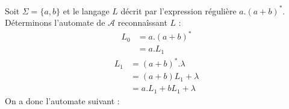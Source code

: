 \begin{example}
    Soit $ \Sigma = \{a,b\}$ et le langage $L$ décrit par l'expression régulière $a.(a+b)^*$. 
    Déterminons l'automate de $ \mathcal{A}$ reconnaîssant $L$ : 
    \begin{align*}
        L_0 &= a.(a + b)^* \\ 
        &= a.L_1 
    \end{align*}  
    \begin{align*}
        L_1 &= (a + b)^* . \lambda \\ 
        &= (a + b) L_1 + \lambda \\ 
        &= a.L_1 + bL_1 + \lambda
    \end{align*}  
    On a donc l'automate suivant : 
    \begin{center}
    \end{center}
\end{example}

